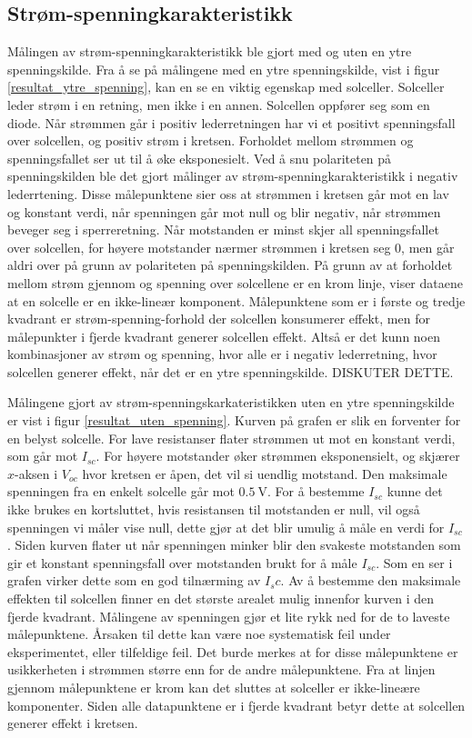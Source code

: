 \documentclass[%
 reprint,
 amsmath,amssymb,
 aps,
 norsk,
 booktabs
]{revtex4-1}
\begin{document}
\subsection{Strøm-spenningkarakteristikk}
Målingen av strøm-spenningkarakteristikk ble gjort med og uten en ytre spenningskilde. Fra å se på målingene med en ytre spenningskilde, vist i figur \vref{resultat_ytre_spenning}, kan en se en viktig egenskap med solceller. Solceller leder strøm i en retning, men ikke i en annen. Solcellen oppfører seg som en diode. Når strømmen går i positiv lederretningen har vi et positivt spenningsfall over solcellen, og positiv strøm i kretsen. Forholdet mellom strømmen og spenningsfallet ser ut til å øke eksponesielt. Ved å snu polariteten på spenningskilden ble det gjort målinger av strøm-spenningkarakteristikk i negativ lederrtening. Disse målepunktene sier oss at strømmen i kretsen går mot en lav og konstant verdi, når spenningen går mot null og blir negativ, når strømmen beveger seg i sperreretning. Når motstanden er minst skjer all spenningsfallet over solcellen, for høyere motstander nærmer strømmen i kretsen seg $0$, men går aldri over på grunn av polariteten på spenningskilden. På grunn av at forholdet mellom strøm gjennom og spenning over solcellene er en krom linje, viser dataene at en solcelle er en ikke-lineær komponent. Målepunktene som er i første og tredje kvadrant er strøm-spenning-forhold der solcellen konsumerer effekt, men for målepunkter i fjerde kvadrant generer solcellen effekt. Altså er det kunn noen kombinasjoner av strøm og spenning, hvor alle er i negativ lederretning, hvor solcellen generer effekt, når det er en ytre spenningskilde. DISKUTER DETTE. \par
Målingene gjort av strøm-spenningskarkateristikken uten en ytre spenningskilde er vist i figur \vref{resultat_uten_spenning}. Kurven på grafen er slik en forventer for en belyst solcelle. For lave resistanser flater strømmen ut mot en konstant verdi, som går mot $I_{sc}$. For høyere motstander øker strømmen eksponensielt, og skjærer $x$-aksen i $V_{oc}$ hvor kretsen er åpen, det vil si uendlig motstand. Den maksimale spenningen fra en enkelt solcelle går mot $\SI{0.5}{\volt}$. For å bestemme $I_{sc}$ kunne det ikke brukes en kortsluttet, hvis resistansen til motstanden er null, vil også spenningen vi måler vise null, dette gjør at det blir umulig å måle en verdi for $I_{sc}$. Siden kurven flater ut når spenningen minker blir den svakeste motstanden som gir et konstant spenningsfall over motstanden brukt for å måle $I_{sc}$. Som en ser i grafen virker dette som en god tilnærming av $I_sc$. Av å bestemme den maksimale effekten til solcellen finner en det største arealet mulig innenfor kurven i den fjerde kvadrant. Målingene av spenningen gjør et lite rykk ned for de to laveste målepunktene. Årsaken til dette kan være noe systematisk feil under eksperimentet, eller tilfeldige feil. Det burde merkes at for disse målepunktene er usikkerheten i strømmen større enn for de andre målepunktene. Fra at linjen gjennom målepunktene er krom kan det sluttes at solceller er ikke-lineære komponenter. Siden alle datapunktene er i fjerde kvadrant betyr dette at solcellen generer effekt i kretsen.
\end{document}
